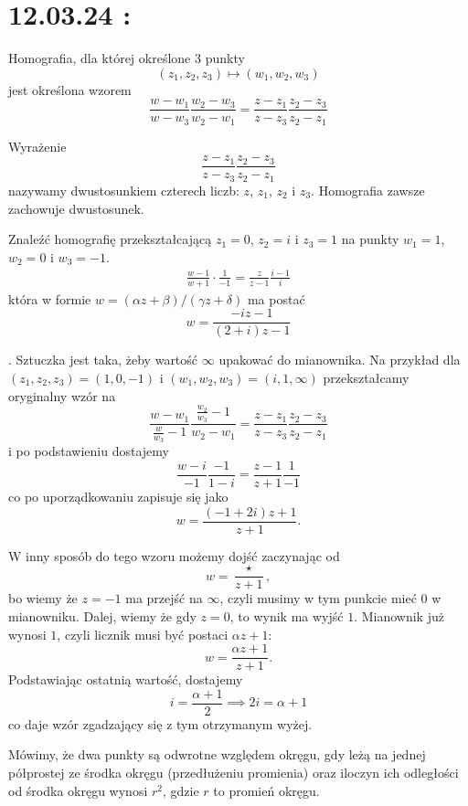 \section{12.03.24 : }

Homografia, dla której określone $3$ punkty
$$(z_1,z_2, z_3)\mapsto (w_1, w_2, w_3)$$
jest określona wzorem 
$$\frac{w-w_1}{w-w_3}\frac{w_2-w_3}{w_2-w_1}=\frac{z-z_1}{z-z_3}\frac{z_2-z_3}{z_2-z_1}$$

Wyrażenie 
$$\frac{z-z_1}{z-z_3}\frac{z_2-z_3}{z_2-z_1}$$ 
nazywamy dwustosunkiem czterech liczb: $z$, $z_1$, $z_2$ i $z_3$. Homografia zawsze zachowuje dwustosunek.

\begin{example}
  \item Znaleźć homografię przekształcającą $z_1=0$, $z_2=i$ i $z_3=1$ na punkty $w_1=1$, $w_2=0$ i $w_3=-1$.
    \begin{align*}
  \frac{w-1}{w+1}\cdot \frac{1}{-1}=\frac{z}{z-1}\frac{i-1}{i}
    \end{align*}
    która w formie $w=(\alpha z+\beta)/(\gamma z+\delta)$ ma postać
    $$w=\frac{-iz-1}{(2+i)z-1}$$
  \item {}. Sztuczka jest taka, żeby wartość $\infty$ upakować do mianownika. Na przykład dla $(z_1, z_2, z_3)=(1, 0, -1)$ i $(w_1, w_2, w_3)=(i, 1, \infty)$ przekształcamy oryginalny wzór na
    $$\frac{w-w_1}{\frac{w}{w_3}-1}\frac{\frac{w_2}{w_3}-1}{w_2-w_1}=\frac{z-z_1}{z-z_3}\frac{z_2-z_3}{z_2-z_1}$$
    i po podstawieniu dostajemy
    $$\frac{w-i}{-1}\frac{-1}{1-i}=\frac{z-1}{z+1}\frac{1}{-1}$$
    co po uporządkowaniu zapisuje się jako
    $$w=\frac{(-1+2i)z+1}{z+1}.$$

    W inny sposób do tego wzoru możemy dojść zaczynając od
    $$w=\frac{\star}{z+1},$$
    bo wiemy że $z=-1$ ma przejść na $\infty$, czyli musimy w tym punkcie mieć $0$ w mianowniku. Dalej, wiemy że gdy $z=0$, to wynik ma wyjść $1$. Mianownik już wynosi $1$, czyli licznik musi być postaci $\alpha z+1$:
    $$w=\frac{\alpha z+ 1}{z+1}.$$
    Podstawiając ostatnią wartość, dostajemy
    $$i=\frac{\alpha+1}{2}\implies 2i=\alpha+1$$
    co daje wzór zgadzający się z tym otrzymanym wyżej.
\end{example}

\begin{definition}
  Mówimy, że dwa punkty są odwrotne względem okręgu, gdy leżą na jednej półprostej ze środka okręgu (przedłużeniu promienia) oraz iloczyn ich odległości od środka okręgu wynosi $r^2$, gdzie $r$ to promień okręgu.
\end{definition}

